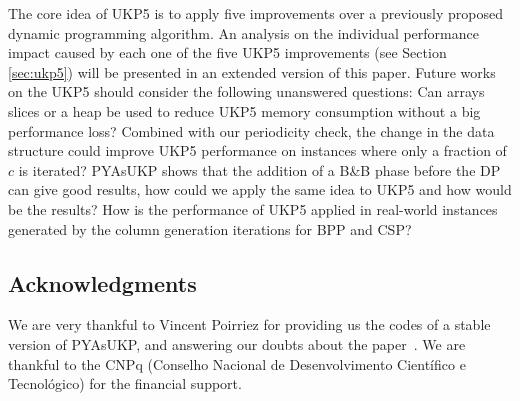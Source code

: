 \documentclass[runningheads,a4paper]{llncs}
\begin{document}
The core idea of UKP5 is to apply five improvements over a previously proposed dynamic programming algorithm.
An analysis on the individual performance impact caused by each one of the five UKP5 improvements (see Section \ref{sec:ukp5}) will be presented in an extended version of this paper. 
Future works on the UKP5 should consider the following unanswered questions: Can arrays slices or a heap be used to reduce UKP5 memory consumption without a big performance loss? 
Combined with our periodicity check, the change in the data structure could improve UKP5 performance on instances where only a fraction of \(c\) is iterated? 
PYAsUKP shows that the addition of a B\&B phase before the DP can give good results, how could we apply the same idea to UKP5 and how would be the results?
How is the performance of UKP5 applied in real-world instances generated by the column generation iterations for BPP and CSP?

\subsection{Acknowledgments}

We are very thankful to Vincent Poirriez for providing us the codes of a stable version of PYAsUKP, and answering our doubts about the paper~\cite{pya}. 
We are thankful to the CNPq (Conselho Nacional de Desenvolvimento Cient\'ifico e Tecnol\'ogico) for the financial support.
\end{document}
